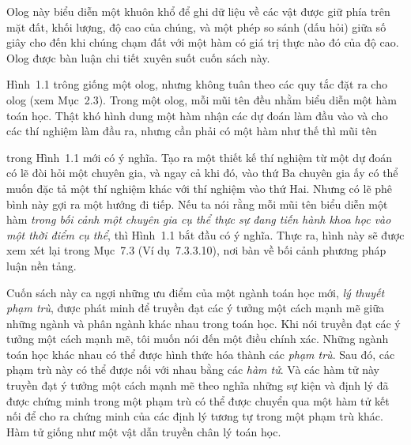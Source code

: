 Olog này biểu diễn một khuôn khổ để ghi dữ liệu về các vật được giữ phía trên mặt đất, khối lượng, độ cao của chúng, và một phép so sánh (dấu hỏi) giữa số giây cho đến khi chúng chạm đất với một hàm có giá trị thực nào đó của độ cao. Olog được bàn luận chi tiết xuyên suốt cuốn sách này.

Hình~1.1 trông giống một olog, nhưng không tuân theo các quy tắc đặt ra cho olog (xem Mục~2.3). Trong một olog, mỗi mũi tên đều nhằm biểu diễn một hàm toán học. Thật khó hình dung một hàm nhận các dự đoán làm đầu vào và cho các thí nghiệm làm đầu ra, nhưng cần phải có một hàm như thế thì mũi tên

\begin{center}
\end{center}

trong Hình~1.1 mới có ý nghĩa. Tạo ra một thiết kế thí nghiệm từ một dự đoán có lẽ đòi hỏi một chuyên gia, và ngay cả khi đó, vào thứ Ba chuyên gia ấy có thể muốn đặc tả một thí nghiệm khác với thí nghiệm vào thứ Hai. Nhưng có lẽ phê bình này gợi ra một hướng đi tiếp. Nếu ta nói rằng mỗi mũi tên biểu diễn một hàm \emph{trong bối cảnh một chuyên gia cụ thể thực sự đang tiến hành khoa học vào một thời điểm cụ thể}, thì Hình~1.1 bắt đầu có ý nghĩa. Thực ra, hình này sẽ được xem xét lại trong Mục~7.3 (Ví dụ~7.3.3.10), nơi bàn về bối cảnh phương pháp luận nền tảng.

Cuốn sách này ca ngợi những ưu điểm của một ngành toán học mới, \emph{lý thuyết phạm trù}, được phát minh để truyền đạt các ý tưởng một cách mạnh mẽ giữa những ngành và phân ngành khác nhau trong toán học. Khi nói truyền đạt các ý tưởng một cách mạnh mẽ, tôi muốn nói đến một điều chính xác. Những ngành toán học khác nhau có thể được hình thức hóa thành các \emph{phạm trù}. Sau đó, các phạm trù này có thể được nối với nhau bằng các \emph{hàm tử}. Và các hàm tử này truyền đạt ý tưởng một cách mạnh mẽ theo nghĩa những sự kiện và định lý đã được chứng minh trong một phạm trù có thể được chuyển qua một hàm tử kết nối để cho ra chứng minh của các định lý tương tự trong một phạm trù khác. Hàm tử giống như một vật dẫn truyền chân lý toán học.


